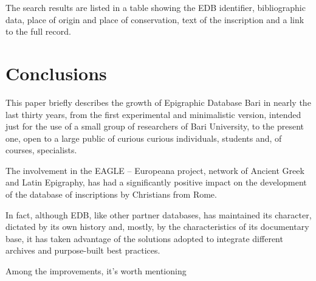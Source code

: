 \documentclass[amsthm,ebook]{saparticle}
\begin{document}
The search results are listed in a table showing the EDB identifier, bibliographic data, place of origin and place of
conservation, text of the inscription and a link to the full record.




\section{Conclusions}


This paper briefly describes the growth of Epigraphic Database Bari in nearly the last thirty years, from the first
experimental and minimalistic version, intended just for the use of a small group of researchers of Bari University, to
the present one, open to a large public of curious curious individuals, students and, of courses, specialists.

The involvement in the EAGLE – Europeana project, network of Ancient Greek and Latin Epigraphy, has had a significantly
positive impact on the development of the database of inscriptions by Christians from Rome. 

In fact, although EDB, like other partner databases, has maintained its character, dictated by its own history and,
mostly, by the characteristics of its documentary base, it has taken advantage of the solutions adopted to integrate
different archives and purpose-built best practices. 

Among the improvements, it’s worth mentioning
\end{document}
